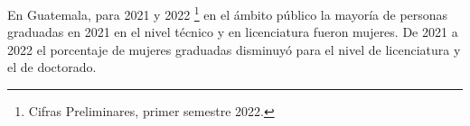 En Guatemala, para 2021 y 2022 \footnote{Cifras Preliminares, primer semestre 2022.} en el ámbito público la mayoría de personas graduadas en 2021 en el nivel técnico y en licenciatura fueron mujeres. De 2021 a 2022 el porcentaje de mujeres graduadas disminuyó para el nivel de licenciatura y el de doctorado. 